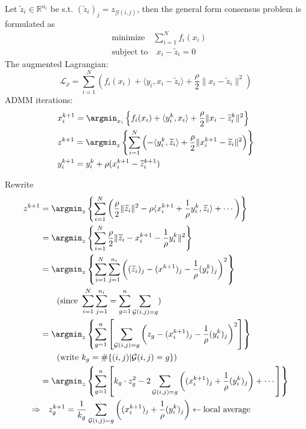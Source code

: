 Let $\widetilde{z}_i \in \mathbb{R}^{n_i}$ be s.t. $(\widetilde{z}_i)_j = z_{\mathcal{G}(i,j)}$, then the general form consensus problem is formulated as
\begin{align*}
    & \text{minimize} \quad \sum\limits_{i=1}^N f_i(x_i) \\
    & \text{subject to} \quad x_i - \widetilde{z}_i = 0
\end{align*}
The augmented Lagrangian:
$$\mathcal{L}_{\rho} = \sum\limits_{i=1}^N \left( f_i(x_i) + \langle y_i, x_i-\widetilde{z}_i \rangle + \dfrac{\rho}{2} \lVert  x_i - \widetilde{z}_i \rVert^2 \right)$$
ADMM iterations:
\begin{align*}
    & x_i^{k+1} = \argmin_{x_i} \left\{ f_i(x_i) + \langle y_i^k, x_i \rangle + \dfrac{\rho}{2}\lVert x_i-\widetilde{z}_i^k \rVert^2 \right\} \\
    & z^{k+1} = \argmin_{z} \left\{ \sum\limits_{i=1}^N \left( -\langle y_i^k, \widetilde{z}_i \rangle + \dfrac{\rho}{2}\lVert x_i^{k+1}-\widetilde{z}_i \rVert^2 \right) \right\} \\
    & y_i^{k+1} = y_i^k + \rho (x_i^{k+1} - \widetilde{z}_i^{k+1})
\end{align*}

Rewrite
\begin{align*}
    z^{k+1} & = \argmin_{z} \left\{ \sum\limits_{i=1}^N \left( \dfrac{\rho}{2} \lVert \widetilde{z}_i \rVert^2 - \rho \langle x_i^{k+1} + \dfrac{1}{\rho} y_i^k, \widetilde{z}_i \rangle + \cdots \right) \right\} \\
    & = \argmin_{z} \left\{ \sum\limits_{i=1}^N \dfrac{\rho}{2} \lVert \widetilde{z}_i - x_i^{k+1} -\dfrac{1}{\rho}y_i^k \rVert^2 \right\} \\
    & = \argmin_{z} \left\{ \sum\limits_{i=1}^N \sum\limits_{j=1}^{n_i} \left( (\widetilde{z}_i)_j - (x^{k+1})_j - \dfrac{1}{\rho} (y_i^k)_j \right)^2 \right\} \\
    & \qquad ( \text{since } \sum\limits_{i=1}^N \sum\limits_{j=1}^{n_i} = \sum\limits_{g=1}^n \sum\limits_{\mathcal{G}(i,j)=g} ) \\
    & = \argmin_{z} \left\{ \sum\limits_{g=1}^n \left[ \sum\limits_{\mathcal{G}(i,j)=g} \left( z_g - (x_i^{k+1})_j - \dfrac{1}{\rho} (y_i^k)_j \right)^2 \right] \right\} \\
    & \qquad ( \text{write } k_g = \# \{ (i,j) | \mathcal{G}(i,j) = g \} ) \\
    & = \argmin_z \left\{ \sum\limits_{g=1}^n \left[ k_g\cdot z_g^2 - 2 \sum\limits_{\mathcal{G}(i,j)=g} \left( (x_i^{k+1})_j + \dfrac{1}{\rho} (y_i^k)_j \right) + \cdots \right] \right\} \\
    \Rightarrow & \quad z_g^{k+1} = \dfrac{1}{k_g} \sum\limits_{\mathcal{G}(i,j)=g} \left( (x_i^{k+1})_j + \dfrac{1}{\rho} (y_i^k)_j \right) \leftarrow \text{local average}
\end{align*}

